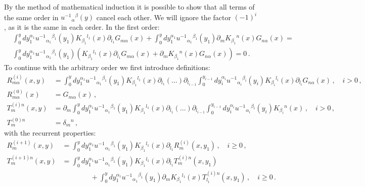 \documentclass[12pt, utf8]{article}
\numberwithin{equation}{section}
\begin{document}
By the method of mathematical induction it is possible to show that all terms of the same order in $u^{-1}{}_{\alpha}{}^{ \beta}(y)$ cancel each other. We will ignore the factor $(-1)^{i}$, as it is the same in each order. In the first order:
\begin{equation}
  \begin{aligned}
    &    \int_{0}^{y} dy_{1}^{\alpha_1} u^{-1 }{}_{\alpha_1}{}^{\beta_1}(y_{1}) K_{\beta_1}{}^{l_1}(x) \partial_{l_1} G_{m \alpha}(x) + \int_{0}^{y} dy_{1}^{\alpha_1} u^{-1 }{}_{\alpha_1}{}^{\beta_1}(y_{1}) \partial_{m} K_{\beta_1}{}^{n}(x)   G_{n \alpha}(x) =   \\
    & \int_{0}^{y} dy_{1}^{\alpha_1} u^{-1 }{}_{\alpha_1}{}^{\beta_1}(y_{1}) \left( K_{\beta_1}{}^{l_1}(x) \partial_{l_1} G_{m \alpha}(x) + \partial_{m} K_{\beta_1}{}^{n}(x)   G_{n \alpha}(x)  \right)= 0 \, .
  \end{aligned}
\end{equation}
To continue with the arbitrary order we first introduce definitions: 
\begin{equation}
    \begin{aligned}
        R^{(i)}_{m \alpha}(x,y) & =  \int_{0}^{y} dy_{1}^{\alpha_1} u^{-1 }{}_{\alpha_1}{}^{\beta_1}(y_1) K_{\beta_1}{}^{l_1}(x) \partial_{l_1}   ( \dots ) \partial_{l_{i-1}}\int_{0}^{y_{i-1}} dy_{i}^{\alpha_i} u^{-1 }{}_{\alpha_i}{}^{\beta_i}(y_{i}) K_{\beta_i}{}^{l_i}(x) \partial_{l_i} G_{n \alpha}(x) \, , \quad i>0 \, , \\
         R^{(0)}_{m \alpha}(x) & = G_{m \alpha}(x) \, , \\
         T^{(i) n}_{m}(x,y) & = \partial_{m} \int_{0}^{y} dy_{1}^{\alpha_1} u^{-1 }{}_{\alpha_1}{}^{\beta_1}(y_1) K_{\beta_1}{}^{l_1}(x) \partial_{l_1}  ( \dots ) \partial_{l_{i-1}} \int_{0}^{y_{i-1}} dy_{i}^{\alpha_i} u^{-1 }{}_{\alpha_i}{}^{\beta_i}(y_{i}) K_{\beta_i}{}^{n}(x) \, , \quad i>0 \, , \\
          T^{(0) n}_{m} & = \delta_{m}{}^{n} \, , 
    \end{aligned}
\end{equation}
with the recurrent properties: 
\begin{equation}
    \begin{aligned}
        R^{(i+1)}_{m}(x,y) & = \int_{0}^{y} dy_{1}^{\alpha_{1}} u^{-1 }{}_{\alpha_1}{}^{\beta_1}(y_{1}) K_{\beta_1}{}^{l_{1}}(x) \partial_{l_1} R^{(i)}_{m}(x,y_1) \, , \quad i \geq 0 \, , \\
        T^{(i+1) n}_{m}(x,y) & = \int_{0}^{y} dy_{1}^{\alpha_{1}} u^{-1 }{}_{\alpha_1}{}^{\beta_1}(y_{1}) K_{\beta_1}{}^{l_{1}}(x) \partial_{l_1} T^{(i) n}_{m}(x,y_1) \\
        & \qquad \qquad + \int_{0}^{y} dy_{1}^{\alpha_{1}} u^{-1 }{}_{\alpha_1}{}^{\beta_1}(y_{1}) \partial_{m} K_{\beta_1}{}^{l_{1}}(x) T^{(i) n}_{l_1}(x,y_1) \, , \quad i \geq 0 \, . 
    \end{aligned}
\end{equation}
\end{document}
